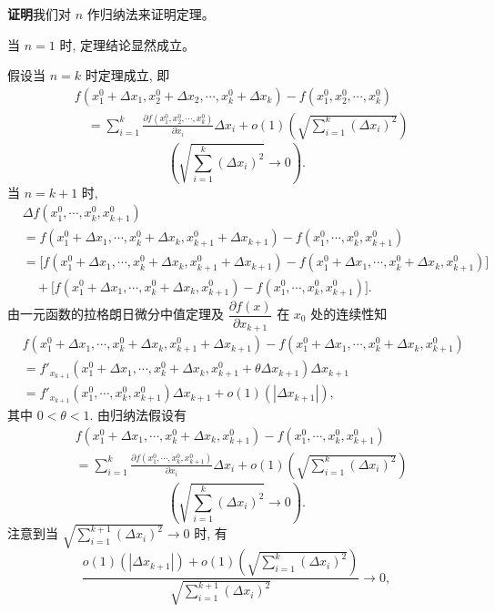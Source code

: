 \documentclass[UTF8, 12pt, fontset=fandol, oneside]{ctexart}
\begin{document}
\noindent\textbf{证明}\quad 我们对 $n$ 作归纳法来证明定理。

当 $n=1$ 时, 定理结论显然成立。

假设当 $n=k$ 时定理成立, 即
\[
\begin{aligned}
&f(x_1^0+\Delta x_1,x_2^0+\Delta x_2,\cdots,x_k^0+\Delta x_k)
  -f(x_1^0,x_2^0,\cdots,x_k^0)\\
&\quad =
  \sum_{i=1}^k
  \frac{\partial f(x_1^0,x_2^0,\cdots,x_k^0)}{\partial x_i}\Delta x_i
  +o(1)\left(\sqrt{\sum_{i=1}^k(\Delta x_i)^2}\right)
\end{aligned}
\]
\[
  \left(\sqrt{\sum_{i=1}^k(\Delta x_i)^2}\to0\right).
\]
当 $n=k+1$ 时,
\[
\begin{aligned}
&\Delta f(x_1^0,\cdots,x_k^0,x_{k+1}^0)\\
&=f(x_1^0+\Delta x_1,\cdots,x_k^0+\Delta x_k,x_{k+1}^0+\Delta x_{k+1})
  -f(x_1^0,\cdots,x_k^0,x_{k+1}^0)\\
&=\big[f(x_1^0+\Delta x_1,\cdots,x_k^0+\Delta x_k,x_{k+1}^0+\Delta x_{k+1})
  -f(x_1^0+\Delta x_1,\cdots,x_k^0+\Delta x_k,x_{k+1}^0)\big]\\
&\quad+\big[f(x_1^0+\Delta x_1,\cdots,x_k^0+\Delta x_k,x_{k+1}^0)
  -f(x_1^0,\cdots,x_k^0,x_{k+1}^0)\big].
\end{aligned}
\]
由一元函数的拉格朗日微分中值定理及 $\dfrac{\partial f(x)}{\partial x_{k+1}}$ 在 $x_0$ 处的连续性知
\[
\begin{aligned}
&f(x_1^0+\Delta x_1,\cdots,x_k^0+\Delta x_k,x_{k+1}^0+\Delta x_{k+1})
  -f(x_1^0+\Delta x_1,\cdots,x_k^0+\Delta x_k,x_{k+1}^0)\\
&=f'_{x_{k+1}}(x_1^0+\Delta x_1,\cdots,x_k^0+\Delta x_k,
  x_{k+1}^0+\theta\Delta x_{k+1})\Delta x_{k+1}\\
&=f'_{x_{k+1}}(x_1^0,\cdots,x_k^0,x_{k+1}^0)\Delta x_{k+1}
  +o(1)(|\Delta x_{k+1}|),
\end{aligned}
\tag{14.1.1}
\]
其中 $0<\theta<1$. 由归纳法假设有
\[
\begin{aligned}
&f(x_1^0+\Delta x_1,\cdots,x_k^0+\Delta x_k,x_{k+1}^0)
  -f(x_1^0,\cdots,x_k^0,x_{k+1}^0)\\
&=
\sum_{i=1}^k
\frac{\partial f(x_1^0,\cdots,x_k^0,x_{k+1}^0)}{\partial x_i}\Delta x_i
+o(1)\left(\sqrt{\sum_{i=1}^k(\Delta x_i)^2}\right)
\end{aligned}
\tag{14.1.2}
\]
\[
  \left(\sqrt{\sum_{i=1}^k(\Delta x_i)^2}\to0\right).
\]
注意到当 $\sqrt{\sum\limits_{i=1}^{k+1}(\Delta x_i)^2}\to0$ 时, 有
\[
  \frac{
  o(1)(|\Delta x_{k+1}|)
  +o(1)\left(\sqrt{\sum\limits_{i=1}^k(\Delta x_i)^2}\right)}
  {\sqrt{\sum\limits_{i=1}^{k+1}(\Delta x_i)^2}}\to0,
\]
\end{document}
